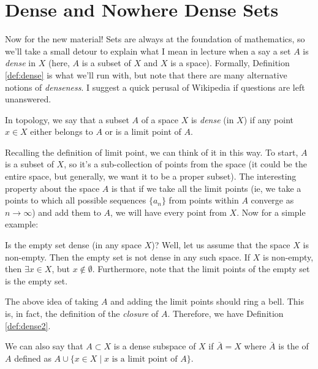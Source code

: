 \documentclass[english, 11pt]{article}
\begin{document}
  \section{Dense and Nowhere Dense Sets}
  Now for the new material! Sets are always at the foundation of mathematics, so we'll take a small detour to explain what I mean in lecture when a say a set $A$ is \textit{dense} in $X$ (here, $A$ is a subset of $X$ and $X$ is a space). Formally, Definition \ref{def:dense} is what we'll run with, but note that there are many alternative notions of \textit{denseness}. I suggest a quick perusal of Wikipedia \cite{wikipedia:dense_set} if questions are left unanswered.

  \begin{defn}
  \label{def:dense}
  In topology, we say that a subset $A$ of a space $X$ is \textit{dense} (in $X$) if any point $x \in X$ either belongs to $A$ or is a limit point of $A$.
  \end{defn}
  Recalling the definition of limit point, we can think of it in this way. To start, $A$ is a subset of $X$, so it's a sub-collection of points from the space (it could be the entire space, but generally, we want it to be a proper subset). The interesting property about the space $A$ is that if we take all the limit points (ie, we take a points to which all possible sequences $\{a_n\}$ from points within $A$ converge as $n \to \infty$) and add them to $A$, we will have every point from $X$. Now for a simple example:

  \begin{exmp}
  Is the empty set dense (in any space $X$)? Well, let us assume that the space $X$ is non-empty. Then the empty set is not dense in any such space. If $X$ is non-empty, then $\exists x \in X$, but $x \notin \emptyset$. Furthermore, note that the limit points of the empty set is the empty set.
  \end{exmp}

  The above idea of taking $A$ and adding the limit points should ring a bell. This is, in fact, the definition of the \textit{closure} of $A$. Therefore, we have Definition \ref{def:dense2}.

  \begin{defn}
  \label{def:dense2}
  We can also say that $A \subset X$ is a dense subspace of $X$ if $\bar{A} = X$ where $\bar{A}$ is the  of $A$ defined as $A \cup \{x \in X \mid x \text{ is a limit point of } A\}$.
  \end{defn}
\end{document}
